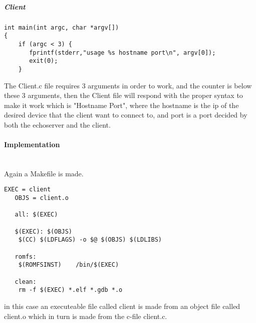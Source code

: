 \subparagraph{Client}
\begin{verbatim}
int main(int argc, char *argv[])
{
    if (argc < 3) {
       fprintf(stderr,"usage %s hostname port\n", argv[0]);
       exit(0);
    }
\end{verbatim}
The Client.c file requires 3 arguments in order to work, and the counter is below these 3 arguments, then the Client file will respond with the proper syntax to make it work which is "Hostname Port", where the hostname is the ip of the desired device that the client want to connect to, and port is a port decided by both the echoserver and the client.

\paragraph{Implementation}\mbox{}\\
Again a Makefile is made.
\begin{verbatim}
EXEC = client
   OBJS = client.o
 
   all: $(EXEC)
 
   $(EXEC): $(OBJS)
	$(CC) $(LDFLAGS) -o $@ $(OBJS) $(LDLIBS)
 
   romfs:
	$(ROMFSINST)    /bin/$(EXEC)
 
   clean:
	rm -f $(EXEC) *.elf *.gdb *.o
\end{verbatim}
in this case an executeable file called client is made from an object file called client.o which in turn is made from the c-file client.c. 